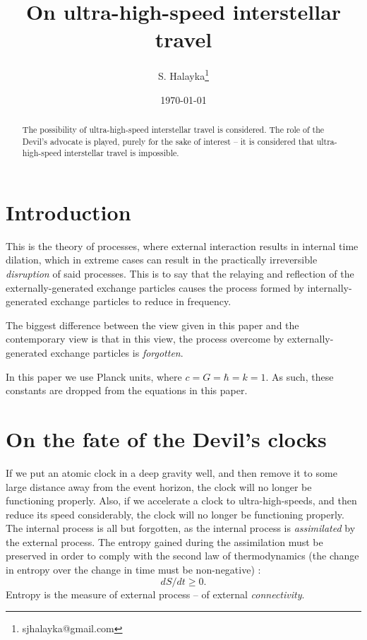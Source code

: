 \documentclass[12pt]{article}
\title{On ultra-high-speed interstellar travel}
\author{S. Halayka\footnote{sjhalayka@gmail.com}}
\date{\today}
\begin{document}
 
\maketitle

\begin{abstract}
The possibility of ultra-high-speed interstellar travel is considered.
The role of the Devil's advocate is played, purely for the sake of interest -- it is considered that ultra-high-speed interstellar travel is impossible.
\end{abstract}



\section{Introduction}
This is the theory of processes, where external interaction results in internal time dilation, which in extreme cases can result in the practically irreversible \textit{disruption} of said processes.
This is to say that the relaying and reflection of the externally-generated exchange particles causes the process formed by internally-generated exchange particles to reduce in frequency. 

The biggest difference between the view given in this paper and the contemporary view is that in this view, the process overcome by externally-generated exchange particles is \textit{forgotten}.

In this paper we use Planck units, where $c = G = \hbar = k = 1$.
As such, these constants are dropped from the equations in this paper.




\section{On the fate of the Devil's clocks}
If we put an atomic clock in a deep gravity well, and then remove it to some large distance away from the event horizon, the clock will no longer be functioning properly.
Also, if we accelerate a clock to ultra-high-speeds, and then reduce its speed considerably, the clock will no longer be functioning properly.
The internal process is all but forgotten, as the internal process is \textit{assimilated} by the external process.
The entropy gained during the assimilation must be preserved in order to comply with the second law of thermodynamics (the change in entropy over the change in time must be non-negative) \cite{jacobson}:
\begin{equation}
dS/dt \geq 0.
\end{equation}
Entropy is the measure of external process -- of external \textit{connectivity}.
\end{document}
